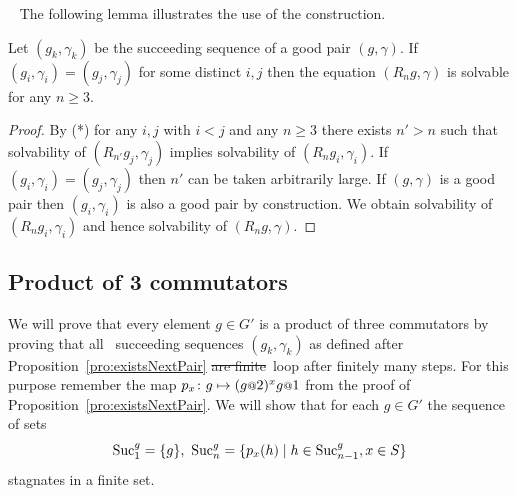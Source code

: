 \documentclass[a4paper,11pt]{amsart}
\newcommand\replace[2]{\st{#1}{\color{Green4}\ #2}}
\begin{document}
\replace{}{
  The following lemma illustrates the use of the construction.

  \begin{lem}
  Let $(g_k,\gamma_k)$ be the succeeding sequence of a good pair $(g,\gamma)$. 
  If $(g_i,\gamma_i) = (g_j,\gamma_j)$ for some distinct $i,j$ then the equation $(R_ng,\gamma)$ is solvable for 
  any $n \ge 3$.
  \end{lem}
  \begin{proof}
  By (*) for any $i,j$ with $i < j$ and any $n \ge 3$ there exists $n' > n$ such that solvability of 
  $(R_{n'}g_j,\gamma_j)$ implies solvability of $(R_{n}g_i,\gamma_i)$. If $(g_i,\gamma_i) = (g_j,\gamma_j)$
  then $n'$ can be taken arbitrarily large. If $(g,\gamma)$ is a good pair then $(g_i,\gamma_i)$ is also a good pair
  by construction. We obtain solvability of $(R_n g_i,\gamma_i)$ and hence solvability of $(R_n g,\gamma)$.
  \end{proof}
}
 
 
%  
%  
\subsection{Product of 3 commutators}
We will prove that every element $g\in G'$ is a product of three commutators by proving that all
\replace{}{succeeding} sequences $(g_k,\gamma_k)$ as defined after Proposition~\ref{pro:existsNextPair} 
\replace{are finite}{loop after finitely many steps}.
For this purpose remember the map $p_x\colon g \mapsto (g\at{2})^x g\at{1}$ from the proof of Proposition~\ref{pro:existsNextPair}.
We will show that for each $g\in G'$ the sequence of sets 
\[\textup{Suc}_1^g=\{g\},\ \textup{Suc}_n^g = \{p_x(h) \mid h\in \textup{Suc}_{n-1}^g, x\in S\} \]
stagnates in a finite set. 
\end{document}
